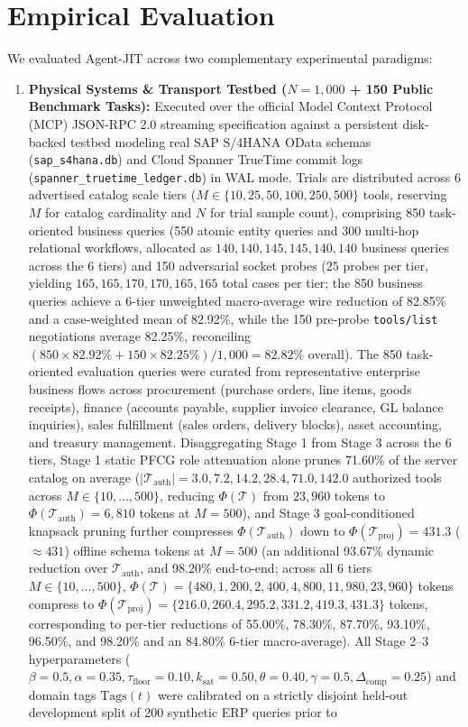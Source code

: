 \documentclass[conference,10pt]{IEEEtran}
\begin{document}
\section{Empirical Evaluation}

We evaluated Agent-JIT across two complementary experimental paradigms:
\begin{enumerate}
    \item \textbf{Physical Systems \& Transport Testbed ($N = 1,000$ + 150 Public Benchmark Tasks):} Executed over the official Model Context Protocol (MCP) JSON-RPC 2.0 streaming specification against a persistent disk-backed testbed modeling real SAP S/4HANA OData schemas (\texttt{sap\_s4hana.db}) and Cloud Spanner TrueTime commit logs (\texttt{spanner\_truetime\_ledger.db}) in WAL mode. Trials are distributed across 6 advertised catalog scale tiers ($M \in \{10, 25, 50, 100, 250, 500\}$ tools, reserving $M$ for catalog cardinality and $N$ for trial sample count), comprising 850 task-oriented business queries (550 atomic entity queries and 300 multi-hop relational workflows, allocated as $140, 140, 145, 145, 140, 140$ business queries across the 6 tiers) and 150 adversarial socket probes ($25$ probes per tier, yielding $165, 165, 170, 170, 165, 165$ total cases per tier; the 850 business queries achieve a 6-tier unweighted macro-average wire reduction of 82.85\% and a case-weighted mean of 82.92\%, while the 150 pre-probe \texttt{tools/list} negotiations average 82.25\%, reconciling $(850 \times 82.92\% + 150 \times 82.25\%)/1{,}000 = 82.82\%$ overall). The 850 task-oriented evaluation queries were curated from representative enterprise business flows across procurement (purchase orders, line items, goods receipts), finance (accounts payable, supplier invoice clearance, GL balance inquiries), sales fulfillment (sales orders, delivery blocks), asset accounting, and treasury management. Disaggregating Stage 1 from Stage 3 across the 6 tiers, Stage 1 static PFCG role attenuation alone prunes 71.60\% of the server catalog on average ($|\mathcal{T}_{\text{auth}}| = 3.0, 7.2, 14.2, 28.4, 71.0, 142.0$ authorized tools across $M \in \{10, \dots, 500\}$, reducing $\Phi(\mathcal{T})$ from $23{,}960$ tokens to $\Phi(\mathcal{T}_{\text{auth}}) = 6{,}810$ tokens at $M=500$), and Stage 3 goal-conditioned knapsack pruning further compresses $\Phi(\mathcal{T}_{\text{auth}})$ down to $\Phi(\mathcal{T}_{\text{proj}}) = 431.3$ ($\approx 431$) offline schema tokens at $M=500$ (an additional 93.67\% dynamic reduction over $\mathcal{T}_{\text{auth}}$, and 98.20\% end-to-end; across all 6 tiers $M \in \{10, \dots, 500\}$, $\Phi(\mathcal{T}) = \{480, 1{,}200, 2{,}400, 4{,}800, 11{,}980, 23{,}960\}$ tokens compress to $\Phi(\mathcal{T}_{\text{proj}}) = \{216.0, 260.4, 295.2, 331.2, 419.3, 431.3\}$ tokens, corresponding to per-tier reductions of 55.00\%, 78.30\%, 87.70\%, 93.10\%, 96.50\%, and 98.20\% and an 84.80\% 6-tier macro-average). All Stage 2--3 hyperparameters ($\beta = 0.5, \alpha = 0.35, \tau_{\text{floor}} = 0.10, k_{\text{sat}} = 0.50, \theta = 0.40, \gamma = 0.5, \Delta_{\text{comp}} = 0.25$) and domain tags $\text{Tags}(t)$ were calibrated on a strictly disjoint held-out development split of 200 synthetic ERP queries prior to 
\end{enumerate}
\end{document}
